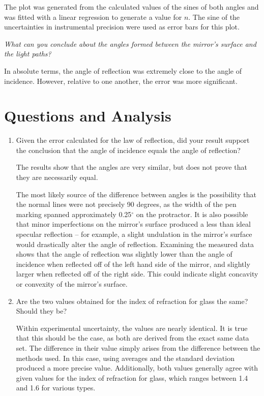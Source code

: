 \documentclass[twocolumn,english]{IEEEtran}
\theoremstyle{plain}
\theoremstyle{plain}
\begin{document}
The plot was generated from the calculated values of the sines of both angles and was fitted with a linear regression to generate a value for $n$. The sine of the uncertainties in instrumental precision were used as error bars for this plot.

\noindent\textit{What can you conclude about the angles formed between the mirror's surface and the light paths?}

In absolute terms, the angle of reflection was extremely close to the angle of incidence. However, relative to one another, the error was more significant.



\section{Questions and Analysis}
\begin{enumerate}
	\item
		Given the error calculated for the law of reflection, did your result support the conclusion that the angle of incidence equals the angle of reflection?

		The results show that the angles are very similar, but does not prove that they are necessarily equal.

		The most likely source of the difference between angles is the possibility that the normal lines were not precisely 90 degrees, as the width of the pen marking spanned approximately 0.25$^{\circ}$ on the protractor. It is also possible that minor imperfections on the mirror's surface produced a less than ideal specular reflection -- for example, a slight undulation in the mirror's surface would drastically alter the angle of reflection. Examining the measured data shows that the angle of reflection was slightly lower than the angle of incidence when reflected off of the left hand side of the mirror, and slightly larger when reflected off of the right side. This could indicate slight concavity or convexity of the mirror's surface.
	\item
		Are the two values obtained for the index of refraction for glass the same? Should they be?

		Within experimental uncertainty, the values are nearly identical. It is true that this should be the case, as both are derived from the exact same data set. The difference in their value simply arises from the difference between the methods used. In this case, using averages and the standard deviation produced a more precise value. Additionally, both values generally agree with given values for the index of refraction for glass, which ranges between 1.4 and 1.6 for various types.
\end{enumerate}

%
%
\end{document}
